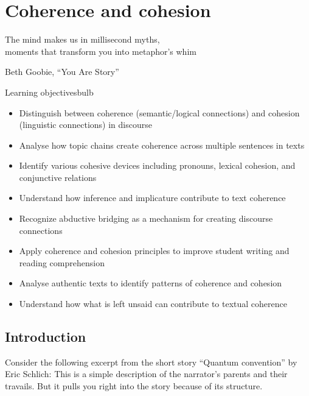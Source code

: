 \chapter{Coherence and cohesion} \label{ch:coherence}

\epigraph{The mind makes us in millisecond myths,\\
moments that transform you into metaphor's whim}{Beth Goobie, \enquote{You Are Story}}

\begin{tblsframedsymbol}{Learning objectives}{bulb}
\begin{itemize}[noitemsep, leftmargin=*]
    \item Distinguish between coherence (semantic/logical connections) and cohesion (linguistic connections) in discourse
    \item Analyse how topic chains create coherence across multiple sentences in texts
    \item Identify various cohesive devices including pronouns, lexical cohesion, and conjunctive relations
    \item Understand how inference and implicature contribute to text coherence
    \item Recognize abductive bridging as a mechanism for creating discourse connections
    \item Apply coherence and cohesion principles to improve student writing and reading comprehension
    \item Analyse authentic texts to identify patterns of coherence and cohesion
    \item Understand how what is left unsaid can contribute to textual coherence
\end{itemize}
\end{tblsframedsymbol}


\section{Introduction}
Consider the following excerpt from the short story \enquote{Quantum convention} by Eric Schlich:
\ea \label{ex:parents}
    \z
\z
This is a simple description of the narrator's parents and their travails. But it pulls you right into the story because of its structure.

